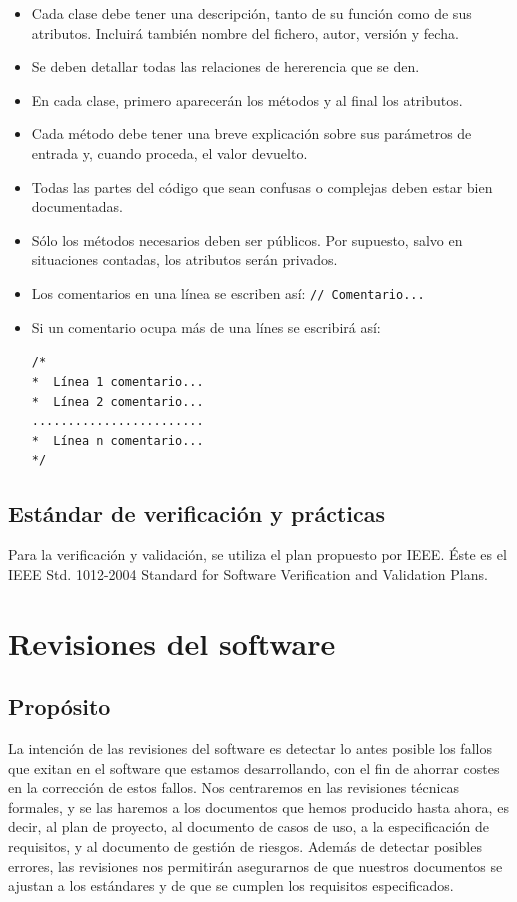 \documentclass[spanish,a4paper,11pt, twoside]{report}	%
\begin{document}
	\begin{itemize}
	\item Cada clase debe tener una descripción, tanto de su función como de sus atributos. Incluirá también nombre del fichero, autor, versión y fecha.
	\item Se deben detallar todas las relaciones de hererencia que se den.
	\item En cada clase, primero aparecerán los métodos y al final los atributos.
	\item Cada método debe tener una breve explicación sobre sus parámetros de entrada y, cuando proceda, el valor devuelto.
	\item Todas las partes del código que sean confusas o complejas deben estar bien documentadas.
	\item Sólo los métodos necesarios deben ser públicos. Por supuesto, salvo en situaciones contadas, los atributos serán privados.
	\item Los comentarios en una línea se escriben así: \quad \texttt{// Comentario...}
	\item Si un comentario ocupa más de una línes se escribirá así: 

			\hspace {-0.33cm} \texttt{/*  \\
			* \ Línea 1 comentario... \\
			 * \ Línea 2 comentario... \\
			........................ \\
			* \ Línea n comentario... \\
			*/ }
	\end{itemize}


	\section{Estándar de verificación y prácticas}
	
	Para la verificación y validación, se utiliza el plan propuesto por IEEE. Éste es el IEEE Std. 1012-2004 Standard for Software Verification and Validation Plans.


\chapter{ Revisiones del software}
	\section{Propósito}
	La intención de las revisiones del software es detectar lo antes posible los fallos que exitan en el software que estamos desarrollando, con el fin de ahorrar costes en la corrección de estos fallos. Nos centraremos en las revisiones técnicas formales,
	y se las haremos a los documentos que hemos producido hasta ahora, es decir, al plan de proyecto, al documento de casos de uso, a la especificación de requisitos, y al documento de gestión de riesgos. Además de detectar posibles errores,
 	las revisiones nos permitirán asegurarnos de que nuestros documentos se ajustan a los estándares y de que se cumplen los requisitos especificados.
\end{document}
